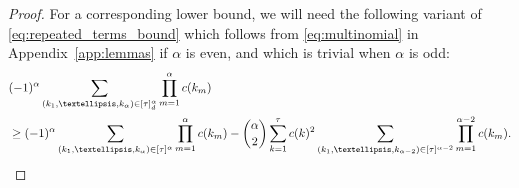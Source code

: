 \documentclass[a4paper,11pt]{article}
\theoremstyle{definition}
\begin{document}
\begin{proof}
For a corresponding lower bound, we will need the following variant of \eqref{eq:repeated_terms_bound} which follows from \eqref{eq:multinomial} in Appendix~\ref{app:lemmas} if $\alpha$ is even, and which is trivial when $\alpha$ is odd:
\begin{align}
&( - 1 )^{ \alpha } \sum_{ ( k_1, \ldots, k_{ \alpha } ) \in [ \tau ]_d^{ \alpha } } \prod_{ m = 1 }^{ \alpha } c( k_m ) \notag\\
&\geq ( - 1 )^{ \alpha }\sum_{(k_1, \ldots, k_{ \alpha }) \in[\tau]^\alpha}  \prod_{ m = 1 }^{ \alpha } c( k_m ) - \binom{ \alpha }{ 2 } \sum_{ k = 1 }^{ \tau } c( k )^2 \sum_{(k_1, \ldots, k_{ \alpha - 2 }) \in [\tau]^{\alpha-2} } \prod_{ m = 1 }^{ \alpha - 2 } c( k_m ). \label{eq:repeated_terms_lower_bound}
\end{align}


\end{proof}
\end{document}
